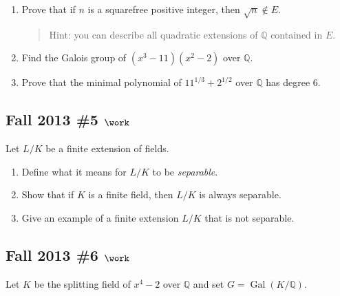 \begin{enumerate}
\def\labelenumi{\alph{enumi}.}
\item
  Prove that if \(n\) is a squarefree positive integer, then
  \(\sqrt{n}\not\in E\).

  \begin{quote}
  Hint: you can describe all quadratic extensions of \({\mathbb{Q}}\)
  contained in \(E\).
  \end{quote}
\item
  Find the Galois group of \((x^3 - 11)(x^2 - 2)\) over
  \({\mathbb{Q}}\).
\item
  Prove that the minimal polynomial of \(11^{1/3} + 2^{1/2}\) over
  \({\mathbb{Q}}\) has degree 6.
\end{enumerate}

\hypertarget{fall-2013-5-work}{%
\subsection{\texorpdfstring{Fall 2013 \#5
\(\work\)}{Fall 2013 \#5 \textbackslash work}}\label{fall-2013-5-work}}

Let \(L/K\) be a finite extension of fields.

\begin{enumerate}
\def\labelenumi{\alph{enumi}.}
\item
  Define what it means for \(L/K\) to be \emph{separable}.
\item
  Show that if \(K\) is a finite field, then \(L/K\) is always
  separable.
\item
  Give an example of a finite extension \(L/K\) that is not separable.
\end{enumerate}

\hypertarget{fall-2013-6-work}{%
\subsection{\texorpdfstring{Fall 2013 \#6
\(\work\)}{Fall 2013 \#6 \textbackslash work}}\label{fall-2013-6-work}}

Let \(K\) be the splitting field of \(x^4-2\) over \({\mathbb{Q}}\) and
set \(G = \operatorname{Gal}(K/{\mathbb{Q}})\).

